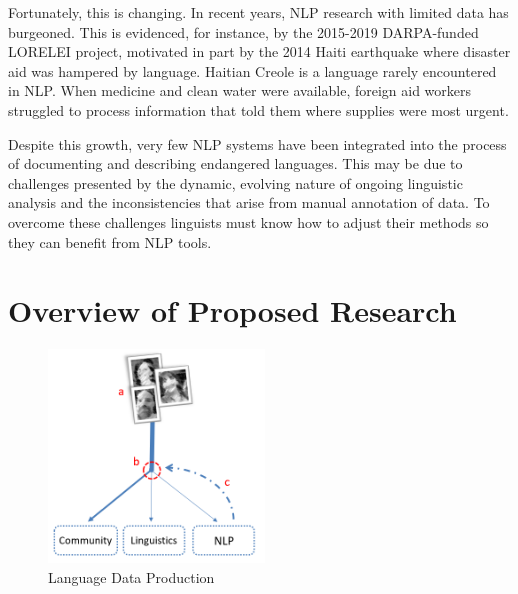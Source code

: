 Fortunately, this is changing. In recent years, NLP research with limited data has burgeoned. This is evidenced, for instance, by the 2015-2019 DARPA-funded LORELEI project, motivated in part by the 2014 Haiti earthquake where disaster aid was hampered by language. Haitian Creole is a language rarely encountered in NLP. When medicine and clean water were available, foreign aid workers struggled to process information that told them where supplies were most urgent. 

Despite this growth, very few NLP systems have been integrated into the process of documenting and describing endangered languages. This may be due to challenges presented by the dynamic, evolving nature of ongoing linguistic analysis and the inconsistencies that arise from manual annotation of data. To overcome these challenges linguists must know how to adjust their methods
so they can benefit from NLP tools.


\section{Overview of Proposed Research}

\begin{figure}[b]
\centering
\includegraphics[width=5.75cm]{figs/Flowchart.PNG}
\caption[Language Data Production]{Language Data Production}
\label{fig:flowchart}
\end{figure}

